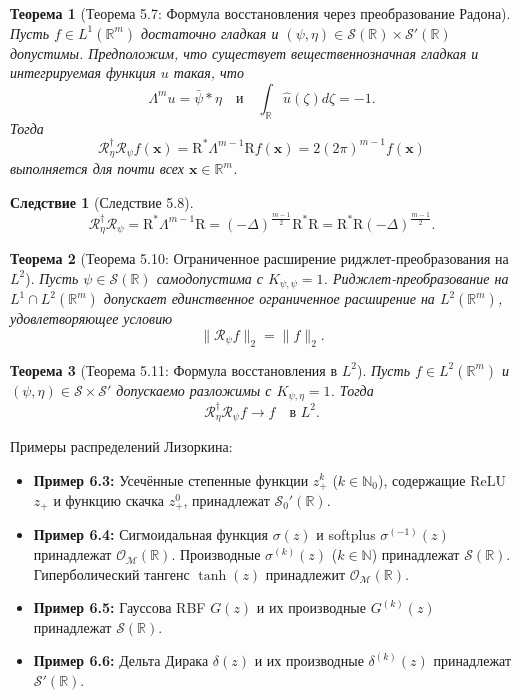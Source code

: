 \documentclass[12pt]{article}
\newtheorem{theorem}{Теорема}
\newtheorem{corollary}{Следствие}
\begin{document}
\begin{theorem}[Теорема 5.7: Формула восстановления через преобразование Радона]
	Пусть \( f \in L^1(\mathbb{R}^m) \) достаточно гладкая и \( (\psi, \eta) \in \mathcal{S}(\mathbb{R}) \times \mathcal{S}'(\mathbb{R}) \) допустимы. Предположим, что существует вещественнозначная гладкая и интегрируемая функция \( u \) такая, что
	\[
	\Lambda^m u = \bar{\psi} * \eta \quad \text{и} \quad \int_{\mathbb{R}} \hat{u}(\zeta) d\zeta = -1.
	\]
	Тогда
	\[
	\mathscr{R}_\eta^\dagger \mathscr{R}_\psi f(\mathbf{x}) = \mathrm{R}^* \Lambda^{m-1} \mathrm{R} f(\mathbf{x}) = 2(2\pi)^{m-1} f(\mathbf{x})
	\]
	выполняется для почти всех \( \mathbf{x} \in \mathbb{R}^m \).
\end{theorem}

\begin{corollary}[Следствие 5.8]
	\[
	\mathscr{R}_\eta^\dagger \mathscr{R}_\psi = \mathrm{R}^* \Lambda^{m-1} \mathrm{R} = (-\Delta)^{\frac{m-1}{2}} \mathrm{R}^* \mathrm{R} = \mathrm{R}^* \mathrm{R}(-\Delta)^{\frac{m-1}{2}}.
	\]
\end{corollary}

\begin{theorem}[Теорема 5.10: Ограниченное расширение риджлет-преобразования на \(L^2\)]
	Пусть \( \psi \in \mathcal{S}(\mathbb{R}) \) самодопустима с \( K_{\psi,\psi} = 1 \). Риджлет-преобразование на \( L^1 \cap L^2(\mathbb{R}^m) \) допускает единственное ограниченное расширение на \( L^2(\mathbb{R}^m) \), удовлетворяющее условию
	\[
	\| \mathscr{R}_{\psi} f \|_2 = \| f \|_2.
	\]
\end{theorem}

\begin{theorem}[Теорема 5.11: Формула восстановления в \(L^2\)]
	Пусть \( f \in L^2(\mathbb{R}^m) \) и \( (\psi, \eta) \in \mathcal{S} \times \mathcal{S}' \) допускаемо разложимы с \( K_{\psi, \eta} = 1 \). Тогда
	\[
	\mathscr{R}_\eta^\dagger \mathscr{R}_\psi f \to f \quad \text{в } L^2.
	\]
\end{theorem}

Примеры распределений Лизоркина:
\begin{itemize}
	\item \textbf{Пример 6.3:} Усечённые степенные функции \( z_+^k \) (\( k \in \mathbb{N}_0 \)), содержащие ReLU \( z_+ \) и функцию скачка \( z_+^0 \), принадлежат \( \mathcal{S}_0'(\mathbb{R}) \).
	
	\item \textbf{Пример 6.4:} Сигмоидальная функция \( \sigma(z) \) и softplus \( \sigma^{(-1)}(z) \) принадлежат \( \mathcal{O}_{\mathcal{M}}(\mathbb{R}) \). Производные \( \sigma^{(k)}(z) \) (\( k \in \mathbb{N} \)) принадлежат \( \mathcal{S}(\mathbb{R}) \). Гиперболический тангенс \( \tanh(z) \) принадлежит \( \mathcal{O}_{\mathcal{M}}(\mathbb{R}) \).
	
	\item \textbf{Пример 6.5:} Гауссова RBF \( G(z) \) и их производные \( G^{(k)}(z) \) принадлежат \( \mathcal{S}(\mathbb{R}) \).
	
	\item \textbf{Пример 6.6:} Дельта Дирака \( \delta(z) \) и их производные \( \delta^{(k)}(z) \) принадлежат \( \mathcal{S}'(\mathbb{R}) \).
\end{itemize}
\end{document}
